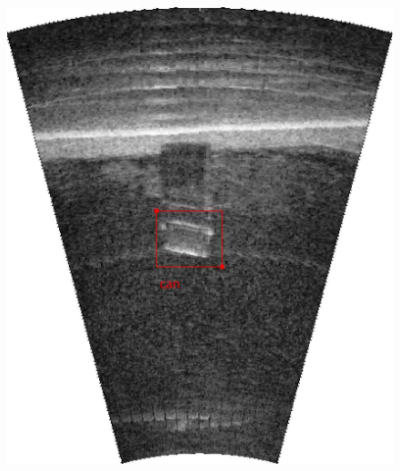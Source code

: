 \begin{figure}[t]
{        \includegraphics[height = 0.2\textheight]{chapters/images/dataset/sonar-scene-can.jpg}    
    }


\end{figure}
